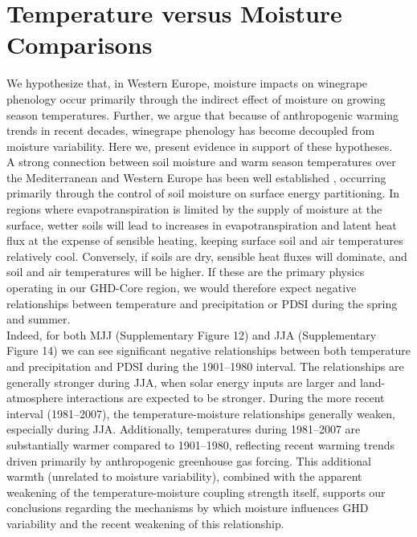 \documentclass[12pt]{article}
\begin{document}
\section*{Temperature versus Moisture Comparisons}
\noindent We hypothesize that, in Western Europe, moisture impacts on winegrape phenology occur primarily through the indirect effect of moisture on growing season temperatures. Further, we argue that because of anthropogenic warming trends in recent decades, winegrape phenology has become decoupled from moisture variability. Here we, present evidence in support of these hypotheses.\\
\indent A strong connection between soil moisture and warm season temperatures over the Mediterranean and Western Europe has been well established \cite{Fischer2007,Miralles2014}, occurring primarily through the control of soil moisture on surface energy partitioning. In regions where evapotranspiration is limited by the supply of moisture at the surface, wetter soils will lead to increases in evapotranspiration and latent heat flux at the expense of sensible heating, keeping surface soil and air temperatures relatively cool. Conversely, if soils are dry, sensible heat fluxes will dominate, and soil and air temperatures will be higher. If these are the primary physics operating in our GHD-Core region, we would therefore expect negative relationships between temperature and precipitation or PDSI during the spring and summer.\\
\indent Indeed, for both MJJ (Supplementary Figure 12) and JJA (Supplementary Figure 14) we can see significant negative relationships between both temperature and precipitation and PDSI during the 1901--1980 interval. The relationships are generally stronger during JJA, when solar energy inputs are larger and land-atmosphere interactions are expected to be stronger. During the more recent interval (1981--2007), the temperature-moisture relationships generally weaken, especially during JJA. Additionally, temperatures during 1981--2007 are substantially warmer compared to 1901--1980, reflecting recent warming trends driven primarily by anthropogenic greenhouse gas forcing. This additional warmth (unrelated to moisture variability), combined with the apparent weakening of the temperature-moisture coupling strength itself, supports our conclusions regarding the mechanisms by which moisture influences GHD variability and the recent weakening of this relationship.
\end{document}
